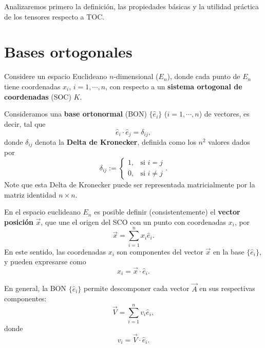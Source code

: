 Analizaremos primero la definición, las propiedades básicas y la utilidad práctica de los tensores respecto a TOC.

\section{Bases ortogonales}

Considere un espacio Euclideano $n$-dimensional ($E_n$), donde cada punto de $E_n$ tiene coordenadas $x_i$, $i=1,\cdots, n$, con respecto a un \textbf{sistema ortogonal de coordenadas} (SOC) $K$. 

Consideramos una \textbf{base ortonormal} (BON) $\lbrace\hat{e}_i\rbrace$ ($i=1,\cdots, n$) de vectores, es decir, tal que
\begin{equation}
\boxed{\hat{e}_i\cdot \hat{e}_j=\delta_{ij},}
\end{equation}
donde $\delta_{ij}$ denota la \textbf{Delta de Kronecker}, definida como los $n^2$ valores dados por
\begin{equation} \label{DK}
\delta_{ij}:=\begin{cases} 1, & \text{si } i=j \\ 0, & \text{si } i\neq j\end{cases} .
\end{equation}
Note que esta Delta de Kronecker puede ser representada matricialmente por la matriz identidad $n\times n$. 

En el espacio euclideano $E_n$ es posible definir (consistentemente) el \textbf{vector posición} $\vec{x}$, que une el origen del SCO con un punto con coordenadas $x_i$, por
\begin{equation}
\vec{x}=\sum_{i=1}^n x_i\hat{e}_i.
\end{equation}
En este sentido, las coordenadas $x_i$ son componentes del vector $\vec{x}$ en la base $\lbrace\hat{e}_i\rbrace$, y pueden expresarse como
\begin{equation}\label{x2}
x_i=\vec{x}\cdot\hat{e}_i.
\end{equation}

En general, la BON $\lbrace\hat{e}_i\rbrace$ permite descomponer cada vector $\vec{A}$ en sus respectivas componentes:
\begin{equation}\label{V1}
\vec{V}=\sum_{i=1}^nv_i\hat{e}_i,
\end{equation}
donde
\begin{equation}\label{v2}
v_i=\vec{V}\cdot\hat{e}_i.
\end{equation}



